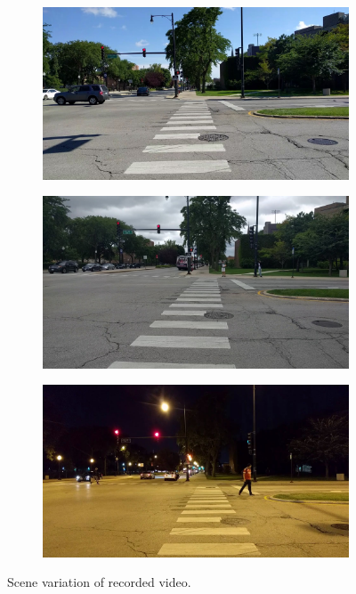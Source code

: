 \begin{figure}[!ht]
  \centering
    \begin {subfigure}
    \centering
    \includegraphics[width=4.2in]{images/sunny.jpg}
  \end{subfigure}

  \begin{subfigure}
    \centering
    \includegraphics[width=4.2in]{images/cloudy.jpg}
  \end{subfigure}

  \begin{subfigure}
    \centering
    \includegraphics[width=4.2in]{images/night.jpg}
  \end{subfigure}
  
\caption{Scene variation of recorded video.}
\label{f:dataset}
\end{figure}

